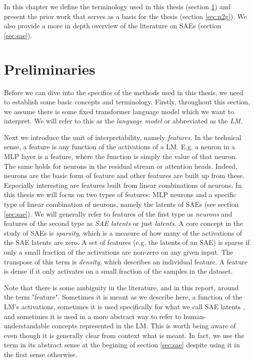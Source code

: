 In this chapter we define the terminology used in this thesis (section \ref{sec:preliminaries}) and present the prior work that serves as a basis for the thesis (section \ref{sec:n2g}).
We also provide a more in depth overview of the literature on \acp{SAE} (section \ref{sec:sae}).

\section{Preliminaries}
\label{sec:preliminaries}
Before we can dive into the specifics of the methods used in this thesis, 
we need to establish some basic concepts and terminology.
Firstly, throughout this section, we assume there is some fixed 
transformer language model \parencite{vaswani_attention_2023} 
which we want to interpret.
We will refer to this as the \emph{language model} or abbreviated as the \emph{LM}.

Next we introduce the unit of interpretability, namely \emph{features}. 
In the technical sense, a feature is any function of the activations 
of a \ac{LM}.
E.g. a neuron in a \ac{MLP} layer is a feature, where the function is simply the value of that neuron.
The same holds for neurons in the residual stream or attention heads.
Indeed, neurons are the basic form of feature and other features are built up from these.
Especially interesting are features built from linear combinations of neurons.
In this thesis we will focus on two types of features:
\Ac{MLP} neurons and a specific type of linear combination of neurons, namely the latents of \acp{SAE} (see section \ref{sec:sae}).
We will generally refer to features of the first type as \emph{neurons} and features of the second type as \emph{SAE latents} or just \emph{latents}.
A core concept in the study of \acp{SAE} is \emph{sparsity}, which is a measure of how many of the activations of the \ac{SAE} latents are zero.
A set of features (e.g. the latents of an SAE) is sparse if only a small fraction of the activations are non-zero on any given input.
The transpose of this term is \emph{density}, which describes an individual feature.
A feature is dense if it only activates on a small fraction of the samples in the dataset.

Note that there is some ambiguity in the literature, and in this report, around the term "feature".
Sometimes it is meant as we describe here, a function of the \ac{LM}'s activations, sometimes it is used specifically for what we call \ac{SAE} latents \parencite{templeton_scaling_2024}, and sometimes it is used in a more abstract way to refer to human-understandable concepts represented in the \ac{LM}.
This is worth being aware of even though it is generally clear from context what is meant.
In fact, we use the term in its abstract sense at the begining of section \ref{sec:sae} despite using it in the first sense otherwise.

